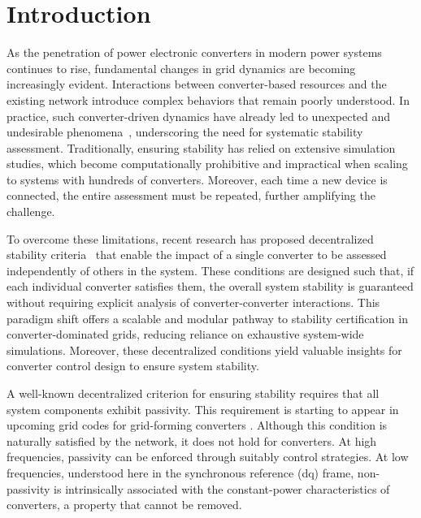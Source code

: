 \section{Introduction}
As the penetration of power electronic converters in modern power systems continues to rise, fundamental changes in grid dynamics are becoming increasingly evident. Interactions between converter-based resources and the existing network introduce complex behaviors that remain poorly understood. In practice, such converter-driven dynamics have already led to unexpected and undesirable phenomena~\cite{Cigre2024}, underscoring the need for systematic stability assessment. Traditionally, ensuring stability has relied on extensive simulation studies, which become computationally prohibitive and impractical when scaling to systems with hundreds of converters. Moreover, each time a new device is connected, the entire assessment must be repeated, further amplifying the challenge.

To overcome these limitations, recent research has proposed decentralized stability criteria~\cite{chenExtendedFrequencyDomainPassivity2025a,huangGainPhaseDecentralized2024,häberle2025decentralizedparametricstabilitycertificates} that enable the impact of a single converter to be assessed independently of others in the system. These conditions are designed such that, if each individual converter satisfies them, the overall system stability is guaranteed without requiring explicit analysis of converter-converter interactions. This paradigm shift offers a scalable and modular pathway to stability certification in converter-dominated grids, reducing reliance on exhaustive system-wide simulations. Moreover, these decentralized conditions yield valuable insights for converter control design to ensure system stability. 


A well-known decentralized criterion for ensuring stability requires that all system components exhibit passivity. This requirement is starting to appear in upcoming grid codes for grid-forming converters \cite{fingridGridCode}. Although this condition is naturally satisfied by the network, it does not hold for converters. At high frequencies, passivity can be enforced through suitably control strategies. 
At low frequencies, understood here in the synchronous reference (dq) frame, non-passivity is intrinsically associated with the constant-power characteristics of converters, a property that cannot be removed. 

